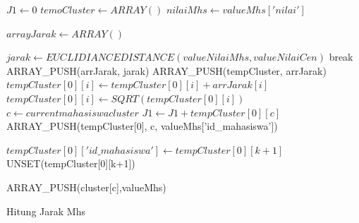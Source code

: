 \begin{algorithm}[H]
  \begin{algorithmic}[1]
        \State $J1 \gets 0$
            \State $temoCluster \gets ARRAY()$ 
            \State $nilaiMhs \gets valueMhs['nilai']$
            
                \State $arrayJarak \gets ARRAY()$
                
                        \State $jarak \gets EUCLIDIANCEDISTANCE(valueNilaiMhs, valueNilaiCen)$
                        \State break
                    \EndIf
                \EndFor
                \State ARRAY\_PUSH(arrJarak, jarak)
            \EndFor
                \State ARRAY\_PUSH(tempCluster, arrJarak)
            \Else
                    \State $tempCluster[0][i] \gets tempCluster[0][i]+ arrJarak[i]$
                    \State $tempCluster[0][i] \gets SQRT(tempCluster[0][i])$
                \EndFor
            \EndIf
            \State $c \gets current mahasiswa cluster$
            \State $J1 \gets J1 + tempCluster[0][c]$
            \State ARRAY\_PUSH(tempCluster[0], c, valueMhs['id\_mahasiswa'])
            
            \State $tempCluster[0]['id\_mahasiswa'] \gets tempCluster[0][k+1]$
            \State UNSET(tempCluster[0][k+1])
            
            \State ARRAY\_PUSH(cluster[c],valueMhs)
        \EndFor
    \EndProcedure
  \end{algorithmic} 
  \caption{Hitung Jarak Mhs}
  \label{alg:hitungJarakMhs}
\end{algorithm}

